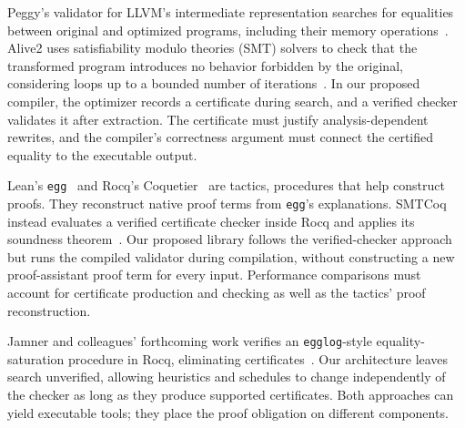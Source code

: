Peggy's validator for LLVM's intermediate representation searches for equalities
  between original and optimized programs, including their memory operations~\cite{llvm-translation-validation}.
Alive2 uses satisfiability modulo theories (SMT) solvers to check that the transformed program
  introduces no behavior forbidden by the original, considering loops up to a bounded number of iterations~\cite{alive2}.
In our proposed compiler, the optimizer records a certificate during search,
  and a verified checker validates it after extraction.
The certificate must justify analysis-dependent rewrites,
  and the compiler's correctness argument must connect the certified equality to the executable output.

Lean's \texttt{egg}~\cite{lean-egg} and Rocq's Coquetier~\cite{coquetier}
  are tactics, procedures that help construct proofs.
They reconstruct native proof terms from \texttt{egg}'s explanations.
SMTCoq instead evaluates a verified certificate checker inside Rocq
  and applies its soundness theorem~\cite{smtcoq}.
Our proposed library follows the verified-checker approach but runs the compiled validator
  during compilation, without constructing a new proof-assistant proof term for every input.
Performance comparisons must account for certificate production and checking
  as well as the tactics' proof reconstruction.

Jamner and colleagues' forthcoming work verifies an \texttt{egglog}-style
  equality-saturation procedure in Rocq, eliminating certificates~\cite{verified-egraphs}.
Our architecture leaves search unverified, allowing heuristics and schedules to change
  independently of the checker as long as they produce supported certificates.
Both approaches can yield executable tools; they place the proof obligation on different components.
